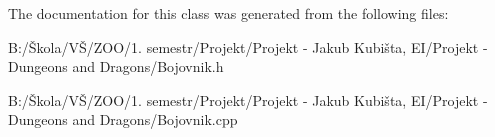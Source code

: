 The documentation for this class was generated from the following files\-:\begin{DoxyCompactItemize}
\item 
B\-:/Škola/\-VŠ/\-Z\-O\-O/1. semestr/\-Projekt/\-Projekt -\/ Jakub Kubišta, E\-I/\-Projekt -\/ Dungeons and Dragons/Bojovnik.\-h\item 
B\-:/Škola/\-VŠ/\-Z\-O\-O/1. semestr/\-Projekt/\-Projekt -\/ Jakub Kubišta, E\-I/\-Projekt -\/ Dungeons and Dragons/Bojovnik.\-cpp\end{DoxyCompactItemize}
